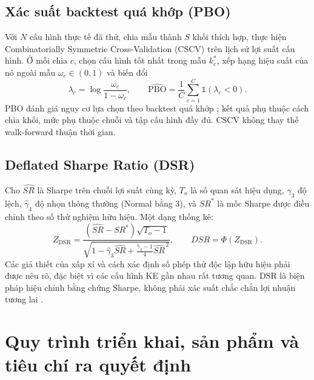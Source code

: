 \documentclass[12pt,a4paper,oneside]{article}
\newcommand{\Ind}{\mathbb{1}}
\begin{document}
\subsection{Xác suất backtest quá khớp (PBO)}
Với $N$ cấu hình thực tế đã thử, chia mẫu thành $S$ khối thích hợp, thực hiện Combinatorially Symmetric Cross-Validation (CSCV) trên lịch sử lợi suất cấu hình. Ở mỗi chia $c$, chọn cấu hình tốt nhất trong mẫu $k_c^*$, xếp hạng hiệu suất của nó ngoài mẫu $\omega_c\in(0,1)$ và biến đổi
\begin{equation}
\lambda_c=\log\frac{\omega_c}{1-\omega_c},\qquad
\widehat{\mathrm{PBO}}=\frac{1}{C}\sum_{c=1}^C\Ind(\lambda_c<0).
\end{equation}
PBO đánh giá nguy cơ lựa chọn theo backtest quá khớp \cite{bailey2017}; kết quả phụ thuộc cách chia khối, mức phụ thuộc chuỗi và tập cấu hình đầy đủ. CSCV không thay thế walk-forward thuận thời gian.

\subsection{Deflated Sharpe Ratio (DSR)}
Cho $\widehat{SR}$ là Sharpe trên chuỗi lợi suất cùng kỳ, $T_o$ là số quan sát hiệu dụng, $\widehat\gamma_3$ độ lệch, $\widehat\gamma_4$ độ nhọn thông thường (Normal bằng 3), và $SR^*$ là mốc Sharpe được điều chỉnh theo số thử nghiệm hữu hiệu. Một dạng thống kê:
\begin{equation}
Z_{\mathrm{DSR}}=\frac{(\widehat{SR}-SR^*)\sqrt{T_o-1}}
{\sqrt{1-\widehat\gamma_3\widehat{SR}+
\frac{\widehat\gamma_4-1}{4}\widehat{SR}^{\,2}}},\qquad
DSR=\Phi(Z_{\mathrm{DSR}}).
\end{equation}
Các giả thiết của xấp xỉ và cách xác định số phép thử độc lập hữu hiệu phải được nêu rõ, đặc biệt vì các cấu hình KE gần nhau rất tương quan. DSR là biện pháp hiệu chỉnh bằng chứng Sharpe, không phải xác suất chắc chắn lợi nhuận tương lai \cite{bailey2014}.

\section{Quy trình triển khai, sản phẩm và tiêu chí ra quyết định}
\end{document}
